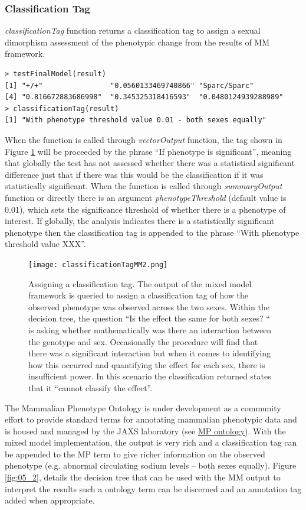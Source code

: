 \documentclass[12pt,a4paper]{article}
\begin{document}
\subsubsection{Classification Tag}
\textit{classificationTag} function returns a classification tag to assign a sexual dimorphism assessment of the phenotypic change from the results of MM framework.
\begingroup
    \fontsize{8pt}{12pt}\selectfont
\begin{verbatim}
> testFinalModel(result)
[1] "+/+"                "0.0560133469740866" "Sparc/Sparc"       
[4] "0.816672883686998"  "0.345325318416593"  "0.0480124939288989"
> classificationTag(result)
[1] "With phenotype threshold value 0.01 - both sexes equally"
\end{verbatim}
\endgroup

When the function is called through \textit{vectorOutput} function,  the tag shown in Figure \ref{fig:05} will be proceeded by the phrase “If phenotype is significant”,  meaning that globally the test has not assessed whether there was a statistical significant difference just that if there was this would be the classification if it was statistically significant.  When the function is called through \textit{summaryOutput} function or directly there is an argument \textit{phenotypeThreshold} (default value is 0.01),  which sets the significance threshold of whether there is a phenotype of interest.  If globally, the analysis indicates there is a statistically significant phenotype then the classification tag is appended to the phrase “With phenotype threshold value XXX”.

\begin{figure}[!tpb]%
\centerline{\texttt{[image: classificationTagMM2.png]}}
\caption{Assigning a classification tag. The output of the mixed model framework is queried to assign a classification tag of how the observed phenotype was observed across the two sexes. Within the decision tree, the question “Is the effect the same for both sexes? “ is asking whether mathematically was there an interaction between the  genotype and sex. Occasionally the procedure will find that there was a significant interaction but when it comes to identifying how this occurred and quantifying the effect for each sex,  there is insufficient power.  In this scenario the classification returned states  that it “cannot classify the effect”.}\label{fig:05}
\end{figure}

The Mammalian Phenotype Ontology is under development as a community effort to provide standard terms for annotating mammalian phenotypic data and is housed and managed by the JAXS laboratory (see \href{http://www.informatics.jax.org/searches/MP_form.shtml}{MP ontology}). With the mixed model implementation, the output is very rich and a classification tag can be appended to the MP term to give richer information on the observed phenotype (e.g. abnormal circulating sodium levels – both sexes equally).  Figure \ref{fig:05_2}, details the decision tree that can be used with the MM output to interpret the results such a ontology term can be discerned and an annotation tag added when appropriate.
\end{document}
